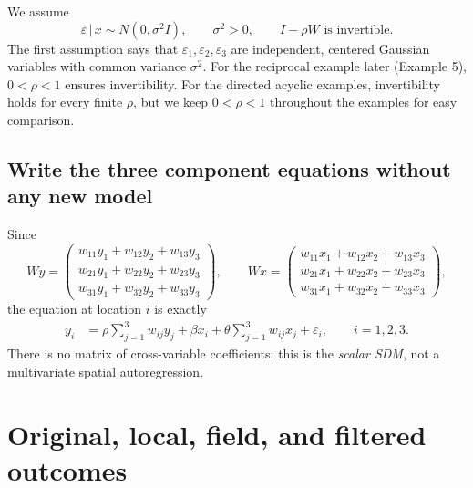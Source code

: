 \documentclass[11pt,a4paper]{article}
\newcommand{\given}{\,\vert\,}
\begin{document}
We assume
\begin{equation}
\varepsilon\given x\sim N(0,\sigma^2 I),\qquad \sigma^2>0,\qquad I-\rho W\text{ is invertible}.\label{eq:assumptions}
\end{equation}
The first assumption says that $\varepsilon_1,\varepsilon_2,\varepsilon_3$ are independent, centered Gaussian variables with common variance $\sigma^2$. For the reciprocal example later (Example 5), $0<\rho<1$ ensures invertibility. For the directed acyclic examples, invertibility holds for every finite $\rho$, but we keep $0<\rho<1$ throughout the examples for easy comparison.

\subsection{Write the three component equations without any new model}
Since
\begin{equation}
Wy=\begin{pmatrix}w_{11}y_1+w_{12}y_2+w_{13}y_3\\w_{21}y_1+w_{22}y_2+w_{23}y_3\\w_{31}y_1+w_{32}y_2+w_{33}y_3\end{pmatrix},
\qquad
Wx=\begin{pmatrix}w_{11}x_1+w_{12}x_2+w_{13}x_3\\w_{21}x_1+w_{22}x_2+w_{23}x_3\\w_{31}x_1+w_{32}x_2+w_{33}x_3\end{pmatrix},\label{eq:lags}
\end{equation}
the equation at location $i$ is exactly
\begin{align}
 y_i&=\rho\sum_{j=1}^3w_{ij}y_j+\beta x_i+\theta\sum_{j=1}^3w_{ij}x_j+\varepsilon_i,\qquad i=1,2,3.\label{eq:element}
\end{align}
There is no matrix of cross-variable coefficients: this is the \emph{scalar SDM}, not a multivariate spatial autoregression.

\section{Original, local, field, and filtered outcomes}
\end{document}
